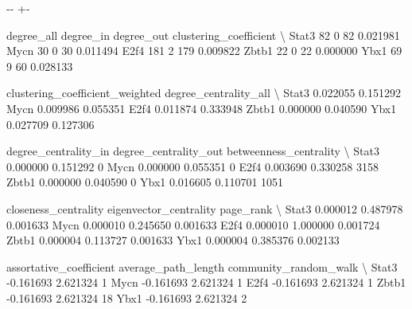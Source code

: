 \documentclass[letterpaper,10pt,english]{sphinxmanual}
\newlength\nbsphinxcodecellspacing
\begin{document}
{

\kern-\sphinxverbatimsmallskipamount\kern-\baselineskip
\kern+\FrameHeightAdjust\kern-\fboxrule
\vspace{\nbsphinxcodecellspacing}

\begin{sphinxVerbatim}[commandchars=\\\{\}]
\llap{\color{nbsphinxout}[82]:\,\hspace{\fboxrule}\hspace{\fboxsep}}       degree\_all  degree\_in  degree\_out  clustering\_coefficient  \textbackslash{}
Stat3          82          0          82                0.021981
Mycn           30          0          30                0.011494
E2f4          181          2         179                0.009822
Zbtb1          22          0          22                0.000000
Ybx1           69          9          60                0.028133

       clustering\_coefficient\_weighted  degree\_centrality\_all  \textbackslash{}
Stat3                         0.022055               0.151292
Mycn                          0.009986               0.055351
E2f4                          0.011874               0.333948
Zbtb1                         0.000000               0.040590
Ybx1                          0.027709               0.127306

       degree\_centrality\_in  degree\_centrality\_out  betweenness\_centrality  \textbackslash{}
Stat3              0.000000               0.151292                       0
Mycn               0.000000               0.055351                       0
E2f4               0.003690               0.330258                    3158
Zbtb1              0.000000               0.040590                       0
Ybx1               0.016605               0.110701                    1051

       closeness\_centrality  eigenvector\_centrality  page\_rank  \textbackslash{}
Stat3              0.000012                0.487978   0.001633
Mycn               0.000010                0.245650   0.001633
E2f4               0.000010                1.000000   0.001724
Zbtb1              0.000004                0.113727   0.001633
Ybx1               0.000004                0.385376   0.002133

       assortative\_coefficient  average\_path\_length  community\_random\_walk  \textbackslash{}
Stat3                -0.161693             2.621324                      1
Mycn                 -0.161693             2.621324                      1
E2f4                 -0.161693             2.621324                      1
Zbtb1                -0.161693             2.621324                     18
Ybx1                 -0.161693             2.621324                      2


\end{sphinxVerbatim}}
\end{document}
